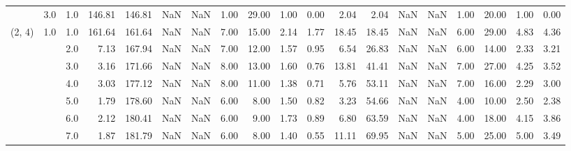 \begin{tabular}{lllrrrrrrrrrrrrrrrr}
       & 3.0 & 1.0  &    146.81 &     146.81 &               NaN &                NaN &  1.00 &  29.00 &             1.00 &                         0.00 &      2.04 &       2.04 &               NaN &                NaN &  1.00 &  20.00 &             1.00 &                         0.00 \\
(2, 4) & 1.0 & 1.0  &    161.64 &     161.64 &               NaN &                NaN &  7.00 &  15.00 &             2.14 &                         1.77 &     18.45 &      18.45 &               NaN &                NaN &  6.00 &  29.00 &             4.83 &                         4.36 \\
       &     & 2.0  &      7.13 &     167.94 &               NaN &                NaN &  7.00 &  12.00 &             1.57 &                         0.95 &      6.54 &      26.83 &               NaN &                NaN &  6.00 &  14.00 &             2.33 &                         3.21 \\
       &     & 3.0  &      3.16 &     171.66 &               NaN &                NaN &  8.00 &  13.00 &             1.60 &                         0.76 &     13.81 &      41.41 &               NaN &                NaN &  7.00 &  27.00 &             4.25 &                         3.52 \\
       &     & 4.0  &      3.03 &     177.12 &               NaN &                NaN &  8.00 &  11.00 &             1.38 &                         0.71 &      5.76 &      53.11 &               NaN &                NaN &  7.00 &  16.00 &             2.29 &                         3.00 \\
       &     & 5.0  &      1.79 &     178.60 &               NaN &                NaN &  6.00 &   8.00 &             1.50 &                         0.82 &      3.23 &      54.66 &               NaN &                NaN &  4.00 &  10.00 &             2.50 &                         2.38 \\
       &     & 6.0  &      2.12 &     180.41 &               NaN &                NaN &  6.00 &   9.00 &             1.73 &                         0.89 &      6.80 &      63.59 &               NaN &                NaN &  4.00 &  18.00 &             4.15 &                         3.86 \\
       &     & 7.0  &      1.87 &     181.79 &               NaN &                NaN &  6.00 &   8.00 &             1.40 &                         0.55 &     11.11 &      69.95 &               NaN &                NaN &  5.00 &  25.00 &             5.00 &                         3.49 \\

\end{tabular}
